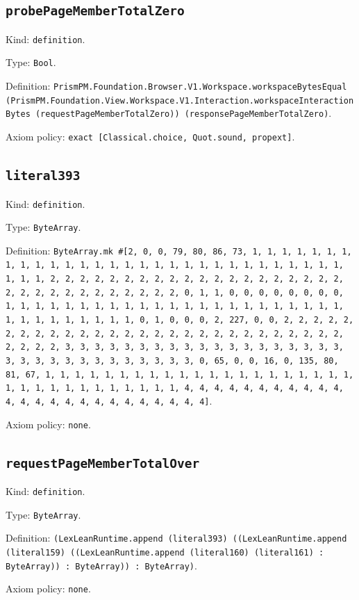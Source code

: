 \documentclass[11pt]{article}
\begin{document}
\subsection*{\texttt{probePageMemberTotalZero}}
\noindent Kind: \texttt{definition}.\par
\noindent Type: \texttt{Bool}.\par
\noindent Definition: \texttt{PrismPM.Foundation.Browser.V1.Workspace.workspaceBytesEqual (PrismPM.Foundation.View.Workspace.V1.Interaction.workspaceInteractionBytes (requestPageMemberTotalZero)) (responsePageMemberTotalZero)}.\par
\noindent Axiom policy: \texttt{exact [Classical.choice, Quot.sound, propext]}.\par
\subsection*{\texttt{literal393}}
\noindent Kind: \texttt{definition}.\par
\noindent Type: \texttt{ByteArray}.\par
\noindent Definition: \texttt{ByteArray.mk \#[2, 0, 0, 79, 80, 86, 73, 1, 1, 1, 1, 1, 1, 1, 1, 1, 1, 1, 1, 1, 1, 1, 1, 1, 1, 1, 1, 1, 1, 1, 1, 1, 1, 1, 1, 1, 1, 1, 1, 1, 2, 2, 2, 2, 2, 2, 2, 2, 2, 2, 2, 2, 2, 2, 2, 2, 2, 2, 2, 2, 2, 2, 2, 2, 2, 2, 2, 2, 2, 2, 2, 2, 0, 1, 1, 0, 0, 0, 0, 0, 0, 0, 0, 1, 1, 1, 1, 1, 1, 1, 1, 1, 1, 1, 1, 1, 1, 1, 1, 1, 1, 1, 1, 1, 1, 1, 1, 1, 1, 1, 1, 1, 1, 1, 1, 0, 1, 0, 0, 0, 2, 227, 0, 0, 2, 2, 2, 2, 2, 2, 2, 2, 2, 2, 2, 2, 2, 2, 2, 2, 2, 2, 2, 2, 2, 2, 2, 2, 2, 2, 2, 2, 2, 2, 2, 2, 3, 3, 3, 3, 3, 3, 3, 3, 3, 3, 3, 3, 3, 3, 3, 3, 3, 3, 3, 3, 3, 3, 3, 3, 3, 3, 3, 3, 3, 3, 3, 3, 0, 65, 0, 0, 16, 0, 135, 80, 81, 67, 1, 1, 1, 1, 1, 1, 1, 1, 1, 1, 1, 1, 1, 1, 1, 1, 1, 1, 1, 1, 1, 1, 1, 1, 1, 1, 1, 1, 1, 1, 1, 1, 1, 4, 4, 4, 4, 4, 4, 4, 4, 4, 4, 4, 4, 4, 4, 4, 4, 4, 4, 4, 4, 4, 4, 4, 4, 4]}.\par
\noindent Axiom policy: \texttt{none}.\par
\subsection*{\texttt{requestPageMemberTotalOver}}
\noindent Kind: \texttt{definition}.\par
\noindent Type: \texttt{ByteArray}.\par
\noindent Definition: \texttt{(LexLeanRuntime.append (literal393) ((LexLeanRuntime.append (literal159) ((LexLeanRuntime.append (literal160) (literal161) : ByteArray)) : ByteArray)) : ByteArray)}.\par
\noindent Axiom policy: \texttt{none}.\par
\end{document}

